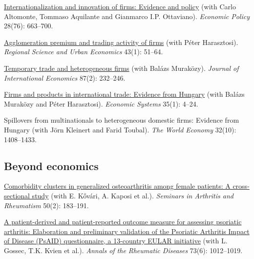 \documentclass[10pt,a4paper]{article}
\newcommand{\jn}[1]{\textit{#1}}
\begin{document}
\begin{cvlist}
  \item[2013] \href{https://doi.org/10.1111/1468-0327.12020}{Internationalization and innovation of firms: Evidence and policy} (with Carlo Altomonte, Tommaso Aquilante and Gianmarco I.P. Ottaviano). \jn{Economic Policy} 28(76): 663--700.
  \item[2013] \href{https://doi.org/10.1016/j.regsciurbeco.2012.11.004}{Agglomeration premium and trading activity of firms} (with Péter Harasztosi). \jn{Regional Science and Urban Economics} 43(1): 51--64.
  \item[2012] \href{https://doi.org/10.1016/j.jinteco.2011.12.007}{Temporary trade and heterogeneous firms} (with Balázs Muraközy). \jn{Journal of International Economics} 87(2): 232--246.
  \item[2011] \href{https://doi.org/10.1016/j.ecosys.2010.11.005}{Firms and products in international trade: Evidence from Hungary} (with Balázs Muraközy and Péter Harasztosi). \jn{Economic Systems} 35(1): 4--24.
  \item[2009] Spillovers from multinationals to heterogeneous domestic firms: Evidence from Hungary (with Jörn Kleinert and Farid Toubal). \jn{The World Economy} 32(10): 1408--1433.
\end{cvlist}

\subsection{Beyond economics}
\begin{cvlist}
  \item[2020] \href{https://doi.org/10.1016/j.semarthrit.2019.09.001}{Comorbidity clusters in generalized osteoarthritis among female patients: A cross-sectional study} (with E. Kővári, A. Kaposi et al.). \jn{Seminars in Arthritis and Rheumatism} 50(2): 183--191.
  \item[2014] \href{https://doi.org/10.1136/annrheumdis-2014-205207}{A patient-derived and patient-reported outcome measure for assessing psoriatic arthritis: Elaboration and preliminary validation of the Psoriatic Arthritis Impact of Disease (PsAID) questionnaire, a 13-country EULAR initiative} (with L. Gossec, T.K. Kvien et al.). \jn{Annals of the Rheumatic Diseases} 73(6): 1012--1019.
\end{cvlist}

\end{document}
